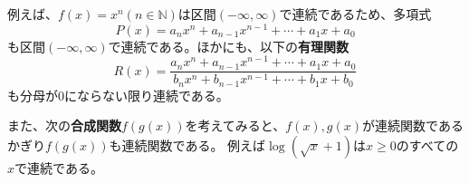 \documentclass[a4j,dvipdfmx]{jsarticle}
\begin{document}
                \noindent
                例えば、$f(x)=x^n(n\in\mathbb{N})$は区間$(-\infty,\infty)$で連続であるため、多項式
                \begin{equation}
                    P(x)=a_nx^n+a_{n-1}x^{n-1}+\cdots+a_{1}x+a_0
                \end{equation}
                も区間$(-\infty,\infty)$で連続である。ほかにも、以下の\textbf{有理関数}
                \begin{equation}
                    R(x)=\frac{a_nx^n+a_{n-1}x^{n-1}+\cdots+a_{1}x+a_0}{b_nx^n+b_{n-1}x^{n-1}+\cdots+b_{1}x+b_0}
                \end{equation}
                も分母が0にならない限り連続である。

                また、次の\textbf{合成関数}$f(g(x))$を考えてみると、$f(x),g(x)$が連続関数であるかぎり$f(g(x))$も連続関数である。
                例えば$\log(\sqrt{x}+1)$は$x\geq 0$のすべての$x$で連続である。\\
\end{document}
